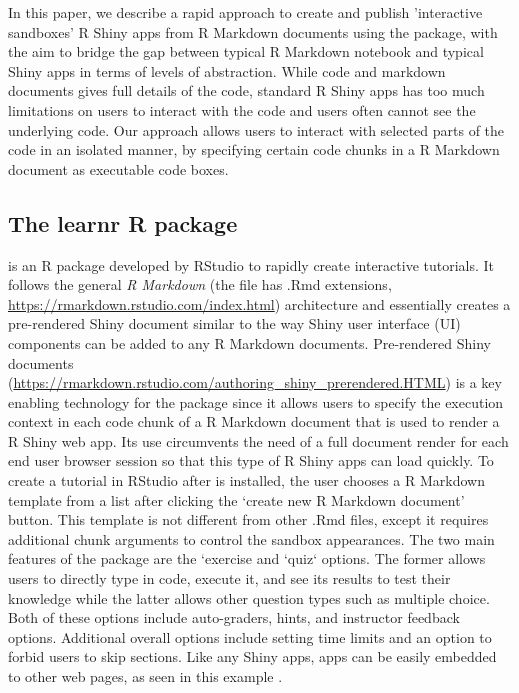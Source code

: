 In this paper, we describe a rapid approach to create and publish
'interactive sandboxes' R Shiny apps from R Markdown documents using
the  package, with the aim to bridge the gap between
typical R Markdown notebook and typical Shiny apps in terms of levels of
abstraction. While code and markdown documents gives full details of the
code, standard R Shiny apps has too much limitations on users to
interact with the code and users often cannot see the underlying code.
Our approach allows users to interact with selected parts of the code in
an isolated manner, by specifying certain code chunks in a R Markdown
document as executable code boxes.

\hypertarget{the-learnr-r-package}{%
\subsection{\texorpdfstring{The learnr R
package}{The learnr R package}}\label{the-learnr-r-package}}

 \citep{learnr} is an R package developed by RStudio to
rapidly create interactive tutorials. It follows the general \textit{R
Markdown} (the file has .Rmd extensions,
\url{https://rmarkdown.rstudio.com/index.html}) architecture and
essentially creates a pre-rendered Shiny document similar to the way
Shiny user interface (UI) components can be added to any R Markdown documents.
Pre-rendered Shiny documents
(\url{https://rmarkdown.rstudio.com/authoring_shiny_prerendered.HTML})
is a key enabling technology for the  package since it
allows users to specify the execution context in each code chunk of a R
Markdown document that is used to render a R Shiny web app. Its use
circumvents the need of a full document render for each end user browser
session so that this type of R Shiny apps can load quickly. To create a
 tutorial in RStudio after  is
installed, the user chooses a  R Markdown template from
a list after clicking the `create new R Markdown document' button. This
template is not different from other .Rmd files, except it requires
additional chunk arguments to control the sandbox appearances. The two
main features of the  package are the `exercise and
`quiz` options. The former allows users to directly type in code,
execute it, and see its results to test their knowledge while the latter
allows other question types such as multiple choice. Both of these
options include auto-graders, hints, and instructor feedback options.
Additional overall options include setting time limits and an option to
forbid users to skip sections. Like any Shiny apps, 
apps can be easily embedded to other web pages, as seen in this example
\citep{rmrwr}.

